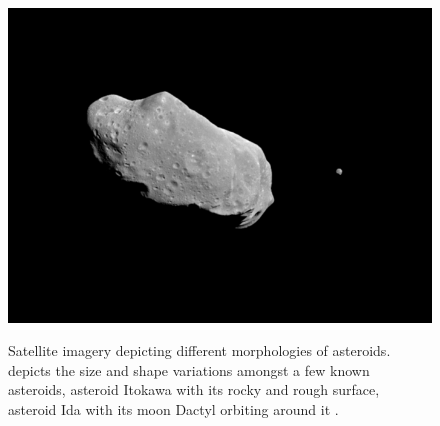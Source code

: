 \begin{figure}[htb]
\begin{minipage}{0.48\columnwidth}
{            \includegraphics[width=\columnwidth, height=0.25\textheight, keepaspectratio=true]{Ida_Dactyl.jpg}
            \label{fig:ida_dactyl_image}
        }
    \end{minipage}
\caption{Satellite imagery depicting different morphologies of asteroids. \protect{} depicts the size and shape variations amongst a few known asteroids, \protect{} asteroid Itokawa with its rocky and rough surface, \protect{} asteroid Ida with its moon Dactyl orbiting around it \parencite{nasa_asteroids_web}.}
\label{fig:asteroid_shapes}
\end{figure}
\FloatBarrier
